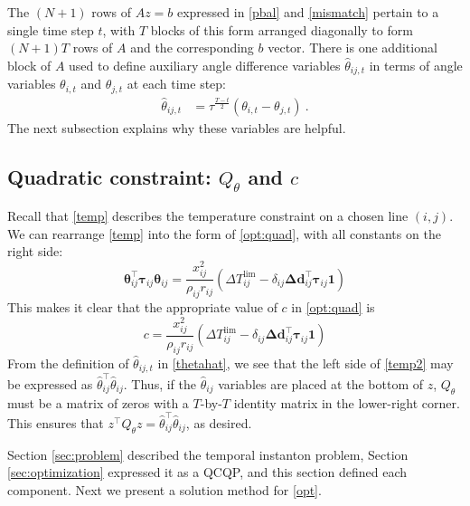 \documentclass[conference]{IEEEtran}
\begin{document}
The $(N+1)$ rows of $Az=b$ expressed in \eqref{pbal} and
\eqref{mismatch} pertain to a single time step $t$, with $T$ blocks of
this form arranged diagonally to form $(N+1)T$ rows of $A$ and the
corresponding $b$ vector. There is one additional block of $A$ used to
define auxiliary angle difference variables $\hat{\theta}_{ij,t}$ in
terms of angle variables $\theta_{i,t}$ and $\theta_{j,t}$ at each
time step:
\begin{align}\label{thetahat}
\hat{\theta}_{ij,t} &= \tau^{\frac{T-t}{2}}(\theta_{i,t} - \theta_{j,t})~.
\end{align}
The next subsection explains why these variables are helpful.

\subsection{Quadratic constraint: $Q_{\theta}$ and $c$}\label{sec:Qtheta}

Recall that \eqref{temp} describes the temperature constraint on a
chosen line $(i,j)$. We can rearrange \eqref{temp} into the form of
\eqref{opt:quad}, with all constants on the right side:
\begin{equation}\label{temp2}
\boldsymbol{\theta}_{ij}^\top \boldsymbol{\tau}_{ij} \boldsymbol{\theta}_{ij} =  \frac{x_{ij}^2}{\rho_{ij} r_{ij}} \left(\Delta T_{ij}^{\text{lim}} - \delta_{ij} \boldsymbol{\Delta d}_{ij}^\top \boldsymbol{\tau}_{ij}\mathbf{1}\right)
\end{equation}
This makes it clear that the appropriate value of $c$ in \eqref{opt:quad} is
\begin{equation}
c = \frac{x_{ij}^2}{\rho_{ij} r_{ij}} \left(\Delta T_{ij}^{\text{lim}} - \delta_{ij} \boldsymbol{\Delta d}_{ij}^\top \boldsymbol{\tau}_{ij}\mathbf{1}\right)
\end{equation}
From the definition of $\hat{\theta}_{ij,t}$ in \eqref{thetahat}, we see that the left side of \eqref{temp2} may be expressed as $\hat{\theta}_{ij}^\top \hat{\theta}_{ij}$. Thus, if the $\hat{\theta}_{ij}$ variables are placed at the bottom of $z$, $Q_{\theta}$ must be a matrix of zeros with a $T$-by-$T$ identity matrix in the lower-right corner. This ensures that $z^\top Q_\theta z = \hat{\theta}_{ij}^\top\hat{\theta}_{ij}$, as desired.

Section \ref{sec:problem} described the temporal instanton problem, Section \ref{sec:optimization} expressed it as a QCQP, and this section defined each component. Next we present a solution method for \eqref{opt}.
\end{document}
